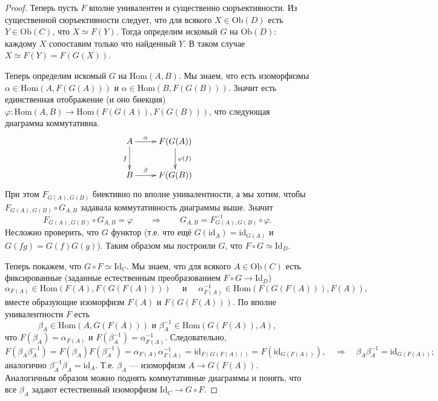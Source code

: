 \documentclass[12pt,a4paper]{article}
\newcommand{\Id}{\mathrm{Id}}
\newcommand{\Hom}{\mathrm{Hom}}
\newcommand{\Ob}{\mathrm{Ob}}
\newcommand{\id}{\mathrm{id}}
\begin{document}
\begin{proof}
        Теперь пусть $F$ вполне унивалентен и существенно сюръективности. Из существенной сюръективности следует, что для всякого $X \in \Ob(D)$ есть $Y \in \Ob(C)$, что $X \simeq F(Y)$. Тогда определим искомый $G$ на $\Ob(D)$: каждому $X$ сопоставим только что найденный $Y$. В таком случае $X \simeq F(Y) = F(G(X))$.

        Теперь определим искомый $G$ на $\Hom(A, B)$. Мы знаем, что есть изоморфизмы $\alpha \in \Hom(A, F(G(A)))$ и $\alpha \in \Hom(B, F(G(B)))$. Значит есть единственная отображение (и оно биекция) $\varphi: \Hom(A, B) \to \Hom(F(G(A)), F(G(B)))$, что следующая диаграмма коммутативна.
        \[
            \xymatrix{
                A \ar[r]^(0.35){\alpha} \ar[d]_{f}& F(G(A)) \ar[d]^{\varphi(f)}\\
                B \ar[r]^(0.35){\beta}& F(G(B))
            }
        \]
        При этом $F_{G(A), G(B)}$ биективно по вполне унивалентности, а мы хотим, чтобы $F_{G(A), G(B)} \circ G_{A, B}$ задавала коммутативность диаграммы выше. Значит
        \[F_{G(A), G(B)} \circ G_{A, B} = \varphi \qquad \Longrightarrow \qquad G_{A, B} = F_{G(A), G(B)}^{-1} \circ \varphi.\]
        Несложно проверить, что $G$ функтор (т.е. что ещё $G(\id_A) = \id_{G(A)}$ и $G(fg) = G(f)G(g)$). Таким образом мы построили $G$, что $F \circ G \simeq \Id_D$.

        Теперь покажем, что $G \circ F \simeq \Id_C$. Мы знаем, что для всякого $A \in \Ob(C)$ есть фиксированные (заданные естественным преобразованием $F \circ G \to \Id_D$)
        \[\alpha_{F(A)} \in \Hom(F(A), F(G(F(A)))) \quad \text{ и } \quad \alpha_{F(A)}^{-1} \in \Hom(F(G(F(A))), F(A)),\]
        вместе образующие изоморфизм $F(A)$ и $F(G(F(A)))$. По вполне унивалентности $F$ есть
        \[\beta_A \in \Hom(A, G(F(A))) \text{ и } \beta_A^{-1} \in \Hom(G(F(A)), A),\]
        что $F(\beta_A) = \alpha_{F(A)}$ и $F(\beta_A^{-1}) = \alpha_{F(A)}^{-1}$. Следовательно,
        \[
            F(\beta_A \beta_A^{-1}) = F(\beta_A) F(\beta_A^{-1}) = \alpha_{F(A)} \alpha_{F(A)}^{-1} = \id_{F(G(F(A)))} = F(\id_{G(F(A))}),
            \quad \Longrightarrow \quad
            \beta_A \beta_A^{-1} = \id_{G(F(A))};
        \]
        аналогично $\beta_A^{-1} \beta_A = \id_A$. Т.е. $\beta_A$ --- изоморфизм $A \to G(F(A))$. Аналогичным образом можно поднять коммутативные диаграммы и понять, что все $\beta_A$ задают естественный изоморфизм $\Id_C \to G \circ F$.
    \end{proof}
\end{document}
